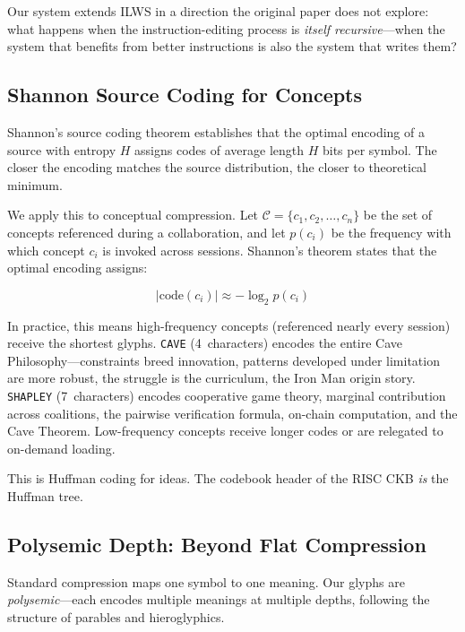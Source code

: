 \documentclass[11pt, a4paper]{article}
\begin{document}
Our system extends ILWS in a direction the original paper does not explore: what happens when the instruction-editing process is \emph{itself recursive}---when the system that benefits from better instructions is also the system that writes them?

\subsection{Shannon Source Coding for Concepts}

Shannon's source coding theorem \citep{shannon1948} establishes that the optimal encoding of a source with entropy $H$ assigns codes of average length $H$ bits per symbol. The closer the encoding matches the source distribution, the closer to theoretical minimum.

We apply this to conceptual compression. Let $\mathcal{C} = \{c_1, c_2, \ldots, c_n\}$ be the set of concepts referenced during a collaboration, and let $p(c_i)$ be the frequency with which concept $c_i$ is invoked across sessions. Shannon's theorem states that the optimal encoding assigns:

\begin{equation}
    |{\text{code}(c_i)}| \approx -\log_2 p(c_i)
    \label{eq:shannon}
\end{equation}

In practice, this means high-frequency concepts (referenced nearly every session) receive the shortest glyphs. \texttt{CAVE} (4~characters) encodes the entire Cave Philosophy---constraints breed innovation, patterns developed under limitation are more robust, the struggle is the curriculum, the Iron Man origin story. \texttt{SHAPLEY} (7~characters) encodes cooperative game theory, marginal contribution across coalitions, the pairwise verification formula, on-chain computation, and the Cave Theorem. Low-frequency concepts receive longer codes or are relegated to on-demand loading.

This is Huffman coding for ideas. The codebook header of the RISC CKB \emph{is} the Huffman tree.

\subsection{Polysemic Depth: Beyond Flat Compression}

Standard compression maps one symbol to one meaning. Our glyphs are \emph{polysemic}---each encodes multiple meanings at multiple depths, following the structure of parables and hieroglyphics.
\end{document}
